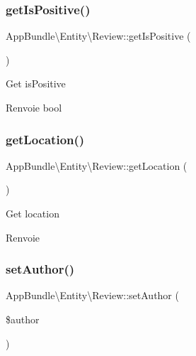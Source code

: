 \subsubsection{\texorpdfstring{get\+Is\+Positive()}{getIsPositive()}}
{\footnotesize\ttfamily App\+Bundle\textbackslash{}\+Entity\textbackslash{}\+Review\+::get\+Is\+Positive (\begin{DoxyParamCaption}{ }\end{DoxyParamCaption})}

Get is\+Positive

\begin{DoxyReturn}{Renvoie}
bool 
\end{DoxyReturn}
\mbox{\label{classAppBundle_1_1Entity_1_1Review_a0e43af27c5317baf107c021dce387388}} 
\subsubsection{\texorpdfstring{get\+Location()}{getLocation()}}
{\footnotesize\ttfamily App\+Bundle\textbackslash{}\+Entity\textbackslash{}\+Review\+::get\+Location (\begin{DoxyParamCaption}{ }\end{DoxyParamCaption})}

Get location

\begin{DoxyReturn}{Renvoie}

\end{DoxyReturn}
\mbox{\label{classAppBundle_1_1Entity_1_1Review_a86f0645495f1ca5aab85cfb2e2f4782b}} 
\subsubsection{\texorpdfstring{set\+Author()}{setAuthor()}}
{\footnotesize\ttfamily App\+Bundle\textbackslash{}\+Entity\textbackslash{}\+Review\+::set\+Author (\begin{DoxyParamCaption}\item[{\textbackslash{}\hyperlink{classAppBundle_1_1Entity_1_1User}{App\+Bundle\textbackslash{}\+Entity\textbackslash{}\+User}}]{\$author }\end{DoxyParamCaption})}

